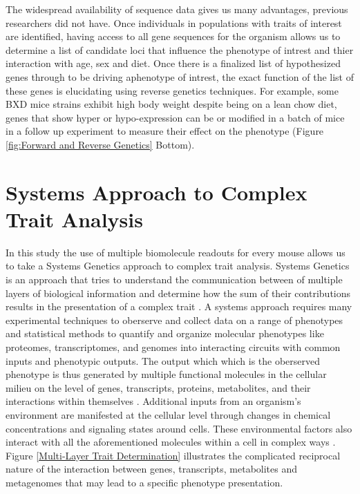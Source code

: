 \documentclass[a4paper,11pt,twoside]{book}
\begin{document}
	 The widespread availability of sequence data gives us many advantages, previous researchers did not have. Once individuals in populations with traits of interest are identified, having access to all gene sequences for the organism allows us to determine a list of candidate loci that influence the phenotype of intrest and thier interaction with age, sex and diet. Once there is a finalized list of hypothesized genes through to be driving aphenotype of intrest, the exact function of the list of these genes is elucidating using reverse genetics techniques\citep{MelindaB.TierneyandKurtH.Lamour2005}. For example, some BXD mice strains exhibit high body weight despite being on a lean chow diet, genes that show hyper or hypo-expression can be or modified in a batch of mice in a follow up experiment to measure their effect on the phenotype (Figure \ref{fig:Forward and Reverse Genetics} Bottom).

	
	\section{Systems Approach to Complex Trait Analysis}
	
    In this study the use of multiple biomolecule readouts for every mouse allows us to take a Systems Genetics approach to complex trait analysis. Systems Genetics is an approach that tries to understand the communication between of multiple layers of biological information and determine how the sum of their contributions results in the presentation of a complex trait \citep{Civelek2014SystemsTraits}. A systems approach requires many experimental techniques to oberserve and collect data on a range of phenotypes and statistical methods to quantify and organize molecular phenotypes like proteomes, transcriptomes, and genomes into interacting circuits with common inputs and phenotypic outputs. The output which which is the oberserved phenotype is thus generated by multiple functional molecules in the cellular milieu on the level of genes, transcripts, proteins, metabolites, and their interactions within themselves \citep{Civelek2014SystemsTraits}. Additional inputs from an organism's environment are manifested at the cellular level through changes in chemical concentrations and signaling states around cells. These environmental factors also interact with all the aforementioned molecules within a cell in complex ways \citep{Civelek2014SystemsTraits}. Figure \ref{Multi-Layer Trait Determination} illustrates the complicated reciprocal nature of the interaction between genes, transcripts, metabolites and metagenomes that may lead to a specific phenotype presentation. 
	
\end{document}
